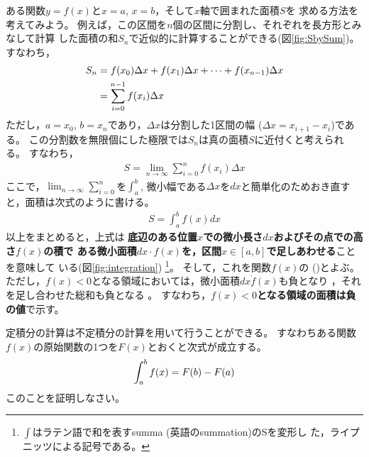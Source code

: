 \documentclass[twocolumn,11pt]{jarticle}
\begin{document}
ある関数$y=f(x)$と$x=a$, $x=b$，そして$x$軸で囲まれた面積$S$を
求める方法を考えてみよう。
例えば，この区間を$n$個の区間に分割し、それぞれを長方形とみなして計算
した面積の和$S_n$で近似的に計算することができる(図\ref{fig:SbySum})。
すなわち，
\begin{align}
  S_n&=f(x_0)\Delta x+f(x_1)\Delta x+\cdots+f(x_{n-1})\Delta x\notag\\
  &=\sum_{i=0}^{n-1}f(x_i)\Delta x
\end{align}
ただし，$a=x_0$, $b=x_n$であり，$\Delta x$は分割した1区間の幅
($\Delta x=x_{i+1}-x_i$)である。
この分割数を無限個にした極限では$S_n$は真の面積$S$に近付くと考えられる。
すなわち，
\begin{align*}
  S=\lim_{n\to \infty}\sum_{i=0}^nf(x_i)\Delta x
\end{align*}
ここで，$\displaystyle\lim_{n\to \infty}\sum_{i=0}^n$を$\displaystyle\int_a^b$,
微小幅である$\Delta x$を$dx$と簡単化のためおき直すと，面積は次式のように書ける。
\begin{align}
\label{eq:integration}
  S=\int_a^bf(x)dx
\end{align}
以上をまとめると，上式は
\textbf{底辺のある位置$x$での微小長さ$dx$およびその点での高さ$f(x)$の積で
ある微小面積$dx\cdot f(x)$を，区間$x\in[a,b]$で足しあわせる}ことを意味して
いる(図\ref{fig:integration})
\footnote{$\int$はラテン語で和を表すsumma (英語のsummation)のSを変形し
  た，ライプニッツによる記号である。}。
そして，これを関数$f(x)$の
()とよぶ。
ただし，$f(x)<0$となる領域においては，微小面積$dx\dot f(x)$も負となり ，それを足し合わせた総和も負となる 。
すなわち，\textbf{$f(x)<0$となる領域の面積は負の値}で示す。


\question
定積分の計算は不定積分の計算を用いて行うことができる。
すなわちある関数$f(x)$の原始関数の1つを$F(x)$とおくと次式が成立する。
\begin{align}
  \int_a^bf(x)=F(b)-F(a)\notag
\end{align}
このことを証明しなさい。
\end{document}
